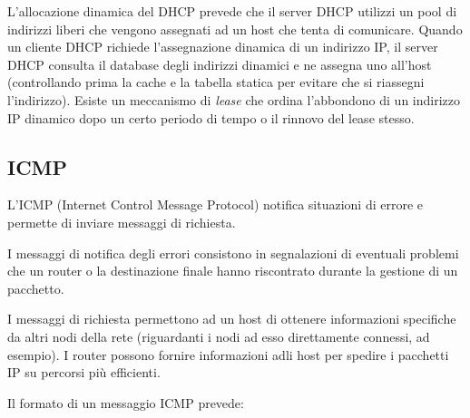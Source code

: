         L'allocazione dinamica del DHCP prevede che il server DHCP utilizzi un pool di indirizzi liberi che vengono assegnati ad un host che tenta di comunicare. Quando un cliente DHCP richiede l'assegnazione dinamica di un indirizzo IP, il server DHCP consulta il database degli indirizzi dinamici e ne assegna uno all'host (controllando prima la cache e la tabella statica per evitare che si riassegni l'indirizzo). Esiste un meccanismo di \textit{lease} che ordina l'abbondono di un indirizzo IP dinamico dopo un certo periodo di tempo o il rinnovo del lease stesso.
        
    \subsection{ICMP}
    
        L'ICMP (Internet Control Message Protocol) notifica situazioni di errore e permette di inviare messaggi di richiesta.
        
        I messaggi di notifica degli errori consistono in segnalazioni di eventuali problemi che un router o la destinazione finale hanno riscontrato durante la gestione di un pacchetto.
        
        I messaggi di richiesta permettono ad un host di ottenere informazioni specifiche da altri nodi della rete (riguardanti i nodi ad esso direttamente connessi, ad esempio). I router possono fornire informazioni adli host per spedire i pacchetti IP su percorsi più efficienti.
        
        \vspace{3mm}
        
        Il formato di un messaggio ICMP prevede:
        
